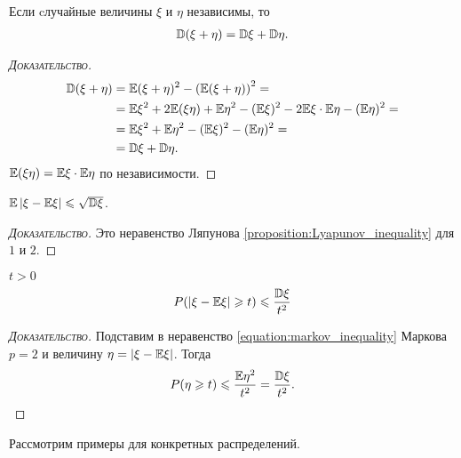 \documentclass[../main.tex]{subfiles}
\begin{document}
\begin{prop}
 Если cлучайные величины $ \xi  $ и $ \eta $ независимы, то
 \begin{align*}
  \mathbb D(\xi + \eta) = \mathbb D\xi + \mathbb D\eta.
 \end{align*}
\end{prop}
\begin{proof}[\normalfont\textsc{Доказательство}]
 \begin{align*}
  \mathbb D(\xi + \eta) &= \mathbb E(\xi + \eta)^{2} - \left( \mathbb E(\xi+\eta) \right)^{2} = \\
  &= \mathbb E\xi^{2} + 2\mathbb E(\xi\eta) + \mathbb E\eta^{2} -  (\mathbb E\xi)^{2} - 2\mathbb E\xi \cdot \mathbb E\eta - (\mathbb E\eta)^{2} = \\
  &=  \mathbb E\xi^{2} + \mathbb E\eta^{2} -  (\mathbb E\xi)^{2} - (\mathbb E\eta)^{2} = \\
  &=\mathbb D\xi+\mathbb D\eta.
 \end{align*} $ \mathbb E(\xi\eta) = \mathbb E\xi \cdot \mathbb E\eta $ по независимости.
\end{proof}

\begin{prop}
 $ \mathbb E \left| \xi - \mathbb E\xi \right| \leqslant \sqrt{\mathbb D\xi} $.
\end{prop}
\begin{proof}[\normalfont\textsc{Доказательство}]
 Это неравенство Ляпунова \eqref{proposition:Lyapunov_inequality} для $ 1 $ и $ 2 $.
\end{proof}

\begin{prop}
 \label{proposition:chebyshev_inequality}
 $ t > 0 $
 \begin{align}
  \label{equation:chebyshev_inequality}
  P(\left| \xi - \mathbb E\xi \right| \geqslant t) \leqslant \frac{\mathbb D\xi}{t^{2}}
 \end{align} 
\end{prop}
\begin{proof}[\normalfont\textsc{Доказательство}]
 Подставим в неравенство \eqref{equation:markov_inequality} Маркова $ p=2 $ и величину $ \eta = \left| \xi - \mathbb E\xi \right| $. Тогда
 \begin{align*}
  P(\eta \geqslant t) \leqslant \frac{\mathbb E\eta^{2}}{t^{2}} = \frac{\mathbb D\xi}{t^{2}}.
 \end{align*} 
\end{proof}

Рассмотрим примеры для конкретных распределений.
\end{document}
